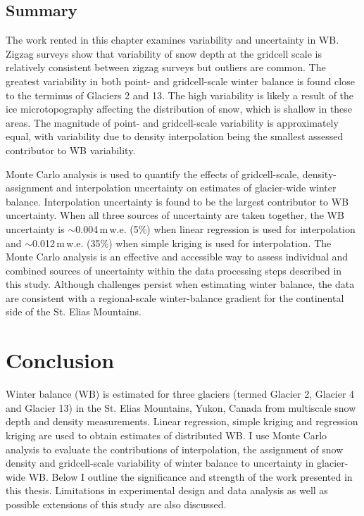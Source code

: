 \documentclass{sfuthesis}
\begin{document}
{ %
 \section{Summary}
 
The work rented in this chapter examines variability and uncertainty in WB. Zigzag surveys show that variability of snow depth at the gridcell scale is relatively consistent between zigzag surveys but outliers are common. The greatest variability in both point- and gridcell-scale winter balance is found close to the terminus of Glaciers 2 and 13. The high variability is likely a result of the ice microtopography affecting the distribution of snow, which is shallow in these areas. The magnitude of point- and gridcell-scale variability is approximately equal, with variability due to density interpolation being the smallest assessed contributor to WB variability. 
 
Monte Carlo analysis is used to quantify the effects of gridcell-scale, density-assignment and interpolation uncertainty on estimates of glacier-wide winter balance. Interpolation uncertainty is found to be the largest contributor to WB uncertainty. When all three sources of uncertainty are taken together, the WB uncertainty is $\sim$0.004\,m\,w.e. (5\%) when linear regression is used for interpolation and $\sim$0.012\,m\,w.e. (35\%) when simple kriging is used for interpolation. The Monte Carlo analysis is an effective and accessible way to assess individual and combined sources of uncertainty within the data processing steps described in this study. Although challenges persist when estimating winter balance, the data are consistent with a regional-scale winter-balance gradient for the continental side of the St. Elias Mountains. 


\chapter{Conclusion}

Winter balance (WB) is estimated for three glaciers (termed Glacier 2, Glacier 4 and Glacier 13) in the St. Elias Mountains, Yukon, Canada from multiscale snow depth and density measurements. Linear regression, simple kriging and regression kriging are used to obtain estimates of distributed WB. I use Monte Carlo analysis to evaluate the contributions of interpolation, the assignment of snow density and gridcell-scale variability of winter balance to uncertainty in glacier-wide WB. Below I outline the significance and strength of the work presented in this thesis. Limitations in experimental design and data analysis as well as possible extensions of this study are also discussed.

}
\end{document}
